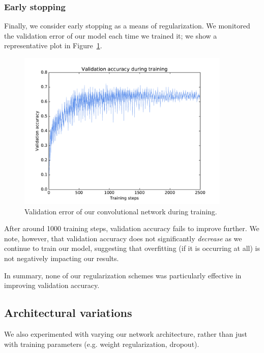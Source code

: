 \documentclass{article}
\begin{document}
\begin{multicols}{2}
\subsubsection{Early stopping}

Finally, we consider early stopping as a means of regularization.
We monitored the validation error
of our model each time we trained it;
we show a representative plot in Figure~\ref{fig:2-4-4-validation-acc}.

\begin{figure}[t]
   \centering
   \includegraphics[width=4in]{img/2-4-4-validation-acc-new.pdf}
   \caption{Validation error of our convolutional network during training.}
   \label{fig:2-4-4-validation-acc}
\end{figure}

After around 1000 training steps,
validation accuracy fails to improve further.
We note, however, that validation accuracy
does not significantly \emph{decrease}
as we continue to train our model,
suggesting that overfitting (if it is occurring at all)
is not negatively impacting our results.

In summary, none of our regularization schemes
was particularly effective in improving validation accuracy.



\subsection{Architectural variations}

We also experimented with varying our network architecture,
rather than just with training parameters
(e.g. weight regularization, dropout).



\end{multicols}
\end{document}
